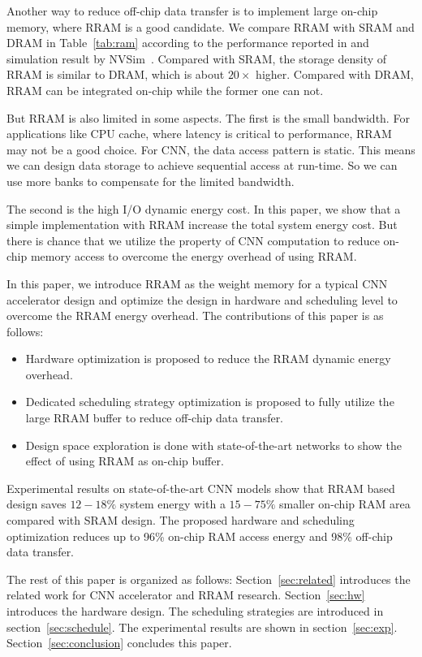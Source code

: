 Another way to reduce off-chip data transfer is to implement large on-chip memory, where RRAM is a good candidate. We compare RRAM with SRAM and DRAM in Table~\ref{tab:ram} according to the performance reported in \cite{ee598, fackenthal201419} and simulation result by NVSim~\cite{dong2014nvsim}. Compared with SRAM, the storage density of RRAM is similar to DRAM, which is about $20\times$ higher. Compared with DRAM, RRAM can be integrated on-chip while the former one can not.



But RRAM is also limited in some aspects. The first is the small bandwidth. For applications like CPU cache, where latency is critical to performance, RRAM may not be a good choice. For CNN, the data access pattern is static. This means we can design data storage to achieve sequential access at run-time. So we can use more banks to compensate for the limited bandwidth.

The second is the high I/O dynamic energy cost. In this paper, we show that a simple implementation with RRAM increase the total system energy cost. But there is chance that we utilize the property of CNN computation to reduce on-chip memory access to overcome the energy overhead of using RRAM. 

In this paper, we introduce RRAM as the weight memory for a typical CNN accelerator design and optimize the design in hardware and scheduling level to overcome the RRAM energy overhead. The contributions of this paper is as follows:
\begin{itemize}
\item {Hardware optimization is proposed to reduce the RRAM dynamic energy overhead.}
\item {Dedicated scheduling strategy optimization is proposed to fully utilize the large RRAM buffer to reduce off-chip data transfer.}
\item {Design space exploration is done with state-of-the-art networks to show the effect of using RRAM as on-chip buffer.}
\end{itemize}
Experimental results on state-of-the-art CNN models show that RRAM based design saves $12-18\%$ system energy with a $15-75\%$ smaller on-chip RAM area compared with SRAM design. The proposed hardware and scheduling optimization reduces up to 96\% on-chip RAM access energy and 98\% off-chip data transfer.

The rest of this paper is organized as follows: Section~\ref{sec:related} introduces the related work for CNN accelerator and RRAM research. Section~\ref{sec:hw} introduces the hardware design. The scheduling strategies are introduced in section~\ref{sec:schedule}. The experimental results are shown in section~\ref{sec:exp}. Section~\ref{sec:conclusion} concludes this paper.